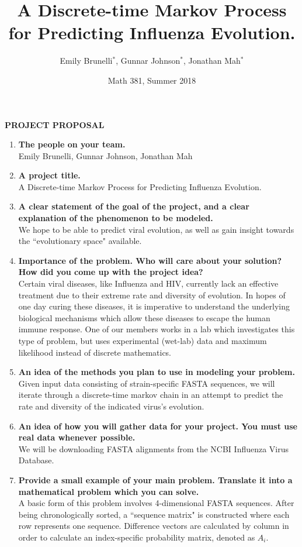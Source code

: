 \documentclass{article}
\title{A Discrete-time Markov Process for Predicting Influenza Evolution.
}
\author{Emily Brunelli$^*$, Gunnar Johnson$^*$, Jonathan Mah$^*$}
\date{Math 381, Summer 2018}
\begin{document}
\begin{center}
    \textbf{PROJECT PROPOSAL}
\end{center}

\begin{enumerate}
    \item \textbf{The people on your team.}\\
    Emily Brunelli, Gunnar Johnson, Jonathan Mah
    \item \textbf{A project title.}\\
    A Discrete-time Markov Process for Predicting Influenza Evolution.
    \item \textbf{A clear statement of the goal of the project, and a clear explanation of the phenomenon to be modeled.}\\
    We hope to be able to predict viral evolution, as well as gain insight towards the ``evolutionary space" available.
    \item \textbf{Importance of the problem. Who will care about your solution? How did you come up with the project idea?}\\
    Certain viral diseases, like Influenza and HIV, currently lack an effective treatment due to their extreme rate and diversity of evolution. In hopes of one day curing these diseases, it is imperative to understand the underlying biological mechanisms which allow these diseases to escape the human immune response. One of our members works in a lab which investigates this type of problem, but uses experimental (wet-lab) data and maximum likelihood instead of discrete mathematics.
    \item \textbf{An idea of the methods you plan to use in modeling your problem.}\\
    Given input data consisting of strain-specific FASTA sequences, we will iterate through a discrete-time markov chain in an attempt to predict the rate and diversity of the indicated virus's evolution.
    \item \textbf{An idea of how you will gather data for your project. You must use real data whenever possible.}\\
    We will be downloading FASTA alignments from the NCBI Influenza Virus Database.
    \item \textbf{Provide a small example of your main problem. Translate it into a mathematical problem which you can solve.}\\
    A basic form of this problem involves 4-dimensional FASTA sequences. After being chronologically sorted, a ``sequence matrix" is constructed where each row represents one sequence. Difference vectors are calculated by column in order to calculate an index-specific probability matrix, denoted as $A_i$.

\end{enumerate}
\end{document}
